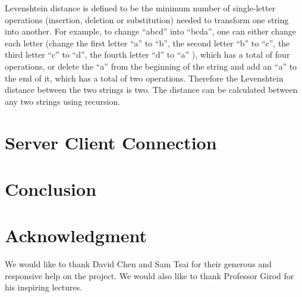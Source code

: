 \documentclass[conference]{IEEEtran}
\begin{document}
Levenshtein distance is defined to be the minimum number of single-letter operations (insertion, deletion or substitution) needed to transform one string into another.  For example, to change ``abcd'' into ``bcda'', one can either change each letter (change the first letter ``a'' to ``b'', the second letter ``b'' to ``c'', the third letter ``c'' to ``d'', the fourth letter ``d'' to ``a'' ), which has a total of four operations, or delete the ``a'' from the beginning of the string and add an ``a'' to the end of it, which has a total of two operations.  Therefore the Levenshtein distance between the two strings is two.  The distance can be calculated between any two strings using recursion.

\section{Server Client Connection}

\section{Conclusion}

\section*{Acknowledgment}
We would like to thank David Chen and Sam Tsai for their generous and responsive help on the project.  We would also like to thank Professor Girod for his inspiring lectures.


\end{document}
